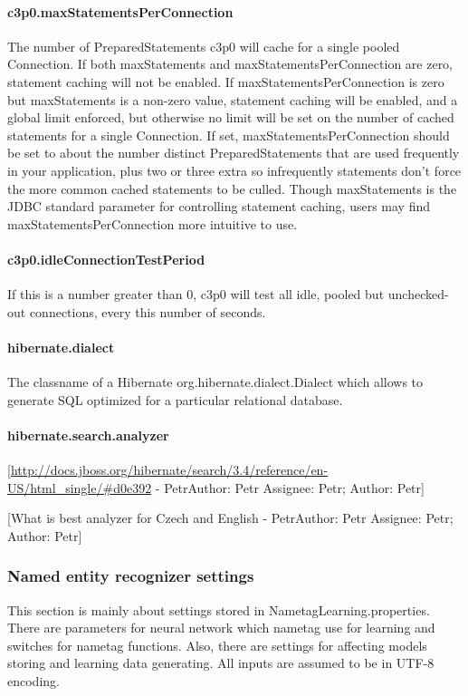 \documentclass[12pt,a4paper]{report}
\makeatletter
\newcommand{\comment}[3][\@empty]{
  {\color{magenta}[#3 - }
  {\color{green}\ifx\@empty#1\relax Author: #2 \else Assignee: #1; Author: #2\fi}{\color{magenta}]}
}
\makeatother
\begin{document}
\paragraph{c3p0.maxStatementsPerConnection}
The number of PreparedStatements c3p0 will cache for a single pooled Connection.
If both maxStatements and maxStatementsPerConnection are zero, statement caching
will not be enabled. If maxStatementsPerConnection is zero but maxStatements is
a non-zero value, statement caching will be enabled, and a global limit enforced,
but otherwise no limit will be set on the number of cached statements for a single
Connection. If set, maxStatementsPerConnection should be set to about the number
distinct PreparedStatements that are used frequently in your application, plus
two or three extra so infrequently statements don't force the more common cached
statements to be culled. Though maxStatements is the JDBC standard parameter for
controlling statement caching, users may find maxStatementsPerConnection more
intuitive to use.

\paragraph{c3p0.idleConnectionTestPeriod}
If this is a number greater than 0, c3p0 will test all idle, pooled but unchecked-out
connections, every this number of seconds.

\paragraph{hibernate.dialect}
The classname of a Hibernate org.hibernate.dialect.Dialect which allows to generate
SQL optimized for a particular relational database.

\paragraph{hibernate.search.analyzer}
\comment[Petr]{Petr}{\url{http://docs.jboss.org/hibernate/search/3.4/reference/en-US/html_single/#d0e392}}
\comment[Petr]{Petr}{What is best analyzer for Czech and English}

\subsubsection{Named entity recognizer settings}
This section is mainly about settings stored in NametagLearning.properties.
There are parameters for neural network which nametag use for learning and switches for nametag functions.
Also, there are settings for affecting models storing and learning data generating.
All inputs are assumed to be in UTF-8 encoding.
\end{document}
